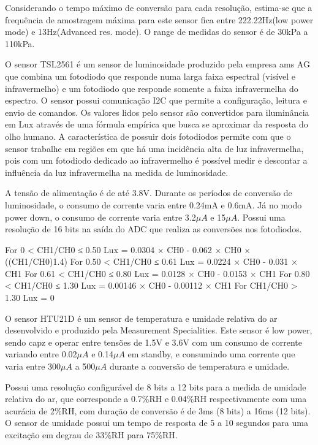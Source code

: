 Considerando o tempo máximo de conversão para cada resolução,
estima-se que a frequência de amostragem máxima para este sensor fica entre
222.22Hz(low power mode) e 13Hz(Advanced res. mode). O range de medidas do
sensor é de 30kPa a 110kPa. \cite{BMP180Datasheet}

O sensor TSL2561 é um sensor de luminosidade produzido pela empresa ams AG que combina um fotodiodo que responde numa larga faixa espectral (visível e infravermelho) e um fotodiodo que responde somente a faixa infravermelha do espectro. O sensor possui comunicação I2C que permite a configuração, leitura e envio de comandos. Os valores lidos pelo sensor são convertidos para iluminância em Lux através de uma fórmula empírica que busca se aproximar da resposta do olho humano. A característica de possuir dois fotodiodos permite com que o sensor trabalhe em regiões em que há uma incidência alta de luz infravermelha, pois com um fotodiodo dedicado ao infravermelho é possível medir e descontar a influência da luz infravermelha na medida de luminosidade. \cite{TSL2561Datasheet}

A tensão de alimentação é de até 3.8V. Durante os períodos de conversão de luminosidade, o consumo de corrente varia entre 0.24mA e 0.6mA. Já no modo power down, o consumo de corrente varia entre 3.2$\mu A$ e 15$\mu A$. Possui uma resolução de 16 bits na saída do ADC que realiza as conversões nos fotodiodos. \cite{TSL2561Datasheet}

\begin{listing}
For 0 < CH1/CH0 ≤ 0.50
Lux = 0.0304 × CH0 - 0.062 × CH0 × ((CH1/CH0)1.4)
For 0.50 < CH1/CH0 ≤ 0.61
Lux = 0.0224 × CH0 - 0.031 × CH1
For 0.61 < CH1/CH0 ≤ 0.80
Lux = 0.0128 × CH0 - 0.0153 × CH1
For 0.80 < CH1/CH0 ≤ 1.30
Lux = 0.00146 × CH0 - 0.00112 × CH1
For CH1/CH0 > 1.30
Lux = 0
\end{listing}

O sensor HTU21D é um sensor de temperatura e umidade relativa do ar desenvolvido
e produzido pela Measurement Specialities. Este sensor é low power, sendo capz e operar
entre tensões de 1.5V e 3.6V com um consumo de corrente variando entre 0.02$\mu
A$ e 0.14$\mu A$ em standby, e consumindo uma corrente que varia entre 300$\mu
A$ a 500$\mu A$ durante a conversão de temperatura e umidade. \cite{HTU21DDatasheet}

Possui uma  resolução configurável de 8 bits a 12 bits para a medida de umidade
relativa do ar, que corresponde a 0.7\%RH e 0.04\%RH respectivamente com uma
acurácia de 2\%RH, com duração de conversão é de 3ms (8 bits) a 16ms (12 bits).
O sensor de umidade possui um tempo de resposta de 5 a 10 segundos para uma
excitação em degrau de 33\%RH para 75\%RH. \cite{HTU21DDatasheet}

